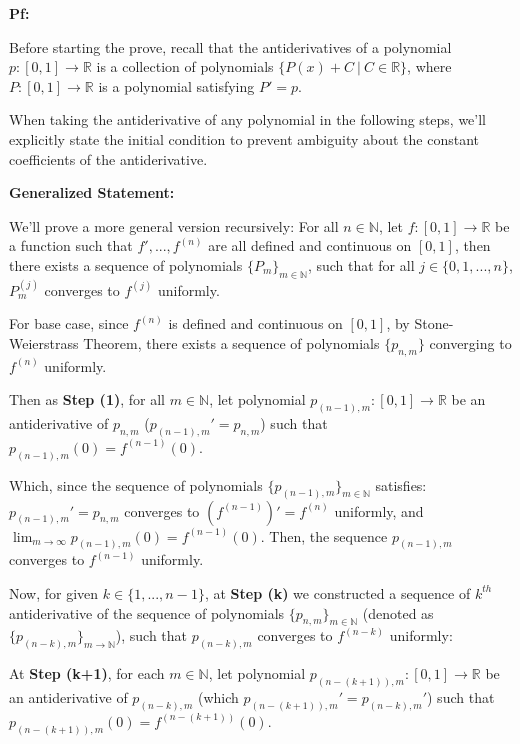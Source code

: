 \documentclass{article}
\begin{document}
\textbf{Pf:}

Before starting the prove, recall that the antiderivatives of a polynomial $p:[0,1]\rightarrow\mathbb{R}$ is a collection of polynomials $\{P(x)+C\ |\ C\in\mathbb{R}\}$, 
where $P:[0,1]\rightarrow\mathbb{R}$ is a polynomial satisfying $P'=p$.

When taking the antiderivative of any polynomial in the following steps, we'll explicitly state the initial condition to prevent ambiguity about the constant coefficients of the antiderivative.

\hfill

\textbf{Generalized Statement:}

We'll prove a more general version recursively: For all $n\in\mathbb{N}$, let $f:[0,1]\rightarrow\mathbb{R}$ be a function such that $f',...,f^{(n)}$ are all defined and continuous on $[0,1]$,
then there exists a sequence of polynomials $\{P_m\}_{m\in\mathbb{N}}$, such that for all $j\in\{0,1,...,n\}$, $P_m^{(j)}$ converges to $f^{(j)}$ uniformly.

\hfill

For base case, since $f^{(n)}$ is defined and continuous on $[0,1]$, by Stone-Weierstrass Theorem, there exists a sequence of polynomials $\{p_{n,m}\}$ converging to $f^{(n)}$ uniformly.

Then as \textbf{Step (1)}, for all $m\in\mathbb{N}$, let polynomial $p_{(n-1),m}:[0,1]\rightarrow\mathbb{R}$ be an antiderivative of $p_{n,m}$ ($p_{(n-1),m}'=p_{n,m}$) such that $p_{(n-1),m}(0) = f^{(n-1)}(0)$.

Which, since the sequence of polynomials $\{p_{(n-1),m}\}_{m\in\mathbb{N}}$ satisfies: $p_{(n-1),m}' = p_{n,m}$ converges to $(f^{(n-1)})' = f^{(n)}$ uniformly, and $\lim_{m\rightarrow\infty}p_{(n-1),m}(0) = f^{(n-1)}(0)$.
Then, the sequence $p_{(n-1),m}$ converges to $f^{(n-1)}$ uniformly.

\hfill

Now, for given $k\in\{1,...,n-1\}$, at \textbf{Step (k)} we constructed a sequence of $k^{th}$ antiderivative of the sequence of polynomials $\{p_{n,m}\}_{m\in\mathbb{N}}$ (denoted as $\{p_{(n-k),m}\}_{m\rightarrow\mathbb{N}}$), such that $p_{(n-k),m}$ converges to $f^{(n-k)}$ uniformly:

At \textbf{Step (k+1)}, for each $m\in\mathbb{N}$, let polynomial $p_{(n-(k+1)),m}:[0,1]\rightarrow\mathbb{R}$ be an antiderivative of $p_{(n-k),m}$ (which $p_{(n-(k+1)),m}' = p_{(n-k),m}'$) such that $p_{(n-(k+1)),m}(0) = f^{(n-(k+1))}(0)$.
\end{document}
